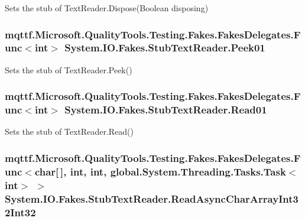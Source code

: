 Sets the stub of Text\-Reader.\-Dispose(\-Boolean disposing)

\hypertarget{class_system_1_1_i_o_1_1_fakes_1_1_stub_text_reader_a19bd5f4645dcbf37547436c26f27138a}{
\subsubsection[{Peek01}]{\setlength{\rightskip}{0pt plus 5cm}mqttf.\-Microsoft.\-Quality\-Tools.\-Testing.\-Fakes.\-Fakes\-Delegates.\-Func$<$int$>$ System.\-I\-O.\-Fakes.\-Stub\-Text\-Reader.\-Peek01}}\label{class_system_1_1_i_o_1_1_fakes_1_1_stub_text_reader_a19bd5f4645dcbf37547436c26f27138a}


Sets the stub of Text\-Reader.\-Peek()

\hypertarget{class_system_1_1_i_o_1_1_fakes_1_1_stub_text_reader_a0df0e5cb6ee215ccfc04c37e8b7d9165}{
\subsubsection[{Read01}]{\setlength{\rightskip}{0pt plus 5cm}mqttf.\-Microsoft.\-Quality\-Tools.\-Testing.\-Fakes.\-Fakes\-Delegates.\-Func$<$int$>$ System.\-I\-O.\-Fakes.\-Stub\-Text\-Reader.\-Read01}}\label{class_system_1_1_i_o_1_1_fakes_1_1_stub_text_reader_a0df0e5cb6ee215ccfc04c37e8b7d9165}


Sets the stub of Text\-Reader.\-Read()

\hypertarget{class_system_1_1_i_o_1_1_fakes_1_1_stub_text_reader_a1ae9d4e28e468e62f947b8bcb00a647f}{
\subsubsection[{Read\-Async\-Char\-Array\-Int32\-Int32}]{\setlength{\rightskip}{0pt plus 5cm}mqttf.\-Microsoft.\-Quality\-Tools.\-Testing.\-Fakes.\-Fakes\-Delegates.\-Func$<$char\mbox{[}$\,$\mbox{]}, int, int, global.\-System.\-Threading.\-Tasks.\-Task$<$int$>$ $>$ System.\-I\-O.\-Fakes.\-Stub\-Text\-Reader.\-Read\-Async\-Char\-Array\-Int32\-Int32}}\label{class_system_1_1_i_o_1_1_fakes_1_1_stub_text_reader_a1ae9d4e28e468e62f947b8bcb00a647f}


